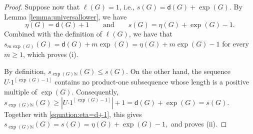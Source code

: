 \documentclass[10pt,a4paper]{amsart}
\begin{document}
\begin{proof}
Suppose now that $\ell(G)=1$, i.e.,
$s(G)=\mathsf d(G)+\exp(G)$. By
Lemma \ref{lemma:universallower}, we have
\begin{equation}\label{equation:eta=d+1}
\eta(G)=\mathsf d(G)+1
\qquad\text{and}\qquad
s(G)=\eta(G)+\exp(G)-1.
\end{equation}
Combined with the definition of $\ell(G)$,  we have that $s_{m\exp(G)}(G)=\mathsf d(G)+m \exp(G)=\eta(G)+m \exp(G)-1$ for every $m\geq 1$,
which proves \rm(i).

By definition,
$s_{\exp(G)\mathbb N}(G)\leq s(G)$.
On the other hand, the sequence $U\boldsymbol{\cdot}1^{[\exp(G)-1]}$
contains no product-one subsequence whose length is a positive
multiple of $\exp(G)$. Consequently,
$s_{\exp(G)\mathbb N}(G)\geq |U\boldsymbol{\cdot}1^{[\exp(G)-1]}|+1=\mathsf d(G)+\exp(G)=s(G).$
Together with \eqref{equation:eta=d+1}, this gives
$s_{\exp(G)\mathbb N}(G)
=s(G)
=\eta(G)+\exp(G)-1,$
and proves \rm(ii).
\end{proof}
\end{document}
